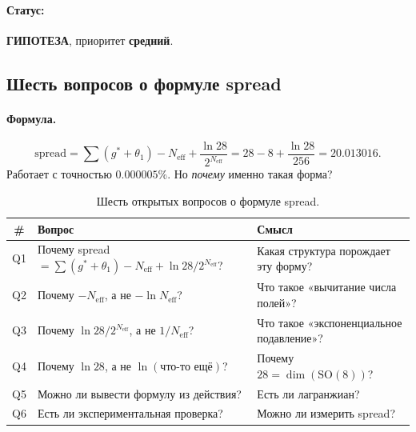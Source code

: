 \documentclass[11pt,a4paper]{article}
\newcommand{\SO}{\mathrm{SO}}
\newcommand{\Neff}{N_{\text{eff}}}
\theoremstyle{definition}
\begin{document}
\paragraph{Статус:} \textbf{ГИПОТЕЗА}, приоритет \textbf{средний}.

\subsection{Шесть вопросов о формуле spread}
\label{subsec:six-spread-questions}

\paragraph{Формула.}
\begin{equation}
    \text{spread} = \sum(g^* + \theta_1) - \Neff 
    + \frac{\ln 28}{2^{\Neff}}
    = 28 - 8 + \frac{\ln 28}{256} = 20.013016.
\end{equation}
Работает с точностью $0.000005\%$. Но \emph{почему} именно 
такая форма?

\begin{table}[htbp]
\centering
\caption{Шесть открытых вопросов о формуле spread.}
\label{tab:six-spread-questions}
\begin{tabular}{clp{6cm}}
\toprule
\# & Вопрос & Смысл \\
\midrule
Q1 & Почему spread $= \sum(g^*+\theta_1) - \Neff + \ln 28/2^{\Neff}$? & 
    Какая структура порождает эту форму? \\[0.3em]
Q2 & Почему $- \Neff$, а не $-\ln \Neff$? & 
    Что такое «вычитание числа полей»? \\[0.3em]
Q3 & Почему $\ln 28/2^{\Neff}$, а не $1/\Neff$? & 
    Что такое «экспоненциальное подавление»? \\[0.3em]
Q4 & Почему $\ln 28$, а не $\ln(\text{что-то ещё})$? & 
    Почему $28 = \dim(\SO(8))$? \\[0.3em]
Q5 & Можно ли вывести формулу из действия? & 
    Есть ли лагранжиан? \\[0.3em]
Q6 & Есть ли экспериментальная проверка? & 
    Можно ли измерить spread? \\
\bottomrule
\end{tabular}
\end{table}

\end{document}
